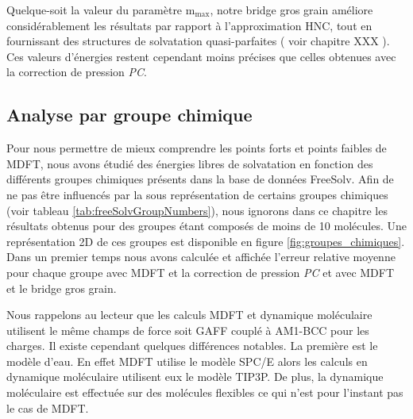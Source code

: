 Quelque-soit la valeur du paramètre $\mathrm{m}_\mathrm{max}$, notre bridge gros grain améliore considérablement les résultats par rapport à l'approximation HNC, tout en fournissant des structures de solvatation quasi-parfaites ( voir chapitre XXX ). Ces valeurs d'énergies restent cependant moins précises que celles obtenues avec la correction de pression \textit{PC}.





\subsection{Analyse par groupe chimique}
Pour nous permettre de mieux comprendre les points forts et points faibles de MDFT, nous avons étudié des énergies libres de solvatation en fonction des différents groupes chimiques présents dans la base de données FreeSolv. Afin de ne pas être influencés par la sous représentation de certains groupes chimiques (voir tableau \ref{tab:freeSolvGroupNumbers}), nous ignorons dans ce chapitre les résultats obtenus pour des groupes étant composés de moins de 10 molécules. Une représentation 2D de ces groupes est disponible en figure \ref{fig:groupes_chimiques}. Dans un premier temps nous avons calculée et affichée l'erreur relative moyenne pour chaque groupe avec MDFT et la correction de pression \textit{PC} et avec MDFT et le bridge gros grain.

Nous rappelons au lecteur que les calculs MDFT et dynamique moléculaire utilisent le même champs de force soit GAFF couplé à AM1-BCC pour les charges. Il existe cependant quelques différences notables. La première est le modèle d'eau. En effet MDFT utilise le modèle SPC/E alors les calculs en dynamique moléculaire utilisent eux le modèle TIP3P. De plus, la dynamique moléculaire est effectuée sur des molécules flexibles ce qui n'est pour l'instant pas le cas de MDFT. 


